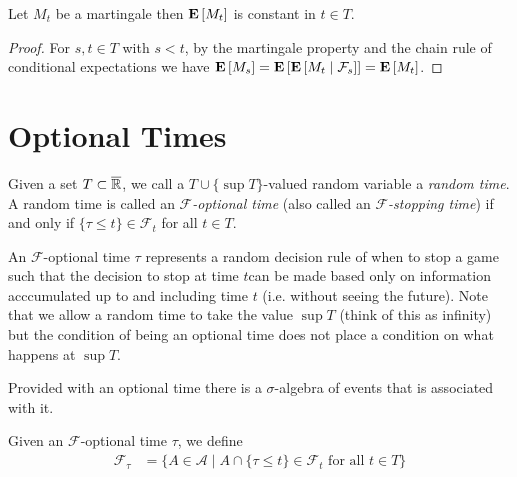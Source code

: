 \begin{lem}Let $M_t$ be a martingale then $\expectation{M_t}$ is
  constant in $t \in T$.
\end{lem}
\begin{proof}For $s,t \in T$ with $s < t$, by the
  martingale property and the chain rule of
  conditional expectations we have
$\expectation{M_s} = \expectation{\cexpectationlong{\mathcal{F}_s}{M_t}} = \expectation{M_t}$.
\end{proof}

\section{Optional Times}

\begin{defn}Given a set $T \subset \overline{\reals}$, we call a $T
  \cup \lbrace \sup T \rbrace$-valued random variable a \emph{random
    time}.  A random time is called an
  \emph{$\mathcal{F}$-optional time} (also called an \emph{$\mathcal{F}$-stopping time}) if and only if $\lbrace \tau \leq
  t \rbrace \in \mathcal{F}_t$ for all $t \in T$.
\end{defn}

An $\mathcal{F}$-optional time $\tau$ represents a random decision
rule of when to stop a game such that the decision  to stop at time $t$can be made based only on
information acccumulated up to and including time $t$ (i.e. without
seeing the future).  Note that we allow a random time to take the value $\sup T$ (think of
this as infinity) but the condition of being an optional time does not
place a condition on what happens at $\sup T$.

Provided with an optional time there is a $\sigma$-algebra of events
that is associated with it.
\begin{defn}Given an $\mathcal{F}$-optional time $\tau$, we define 
\begin{align*}
\mathcal{F}_\tau &= \lbrace
  A \in \mathcal{A} \mid A \cap \lbrace \tau \leq t \rbrace\in
    \mathcal{F}_t \text{ for all } t \in T \rbrace
\end{align*}
\end{defn}


